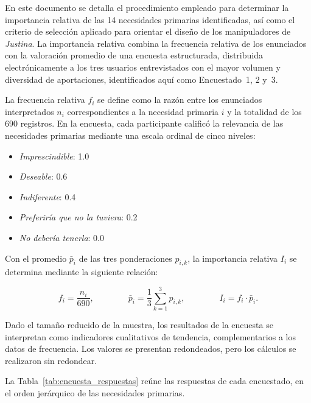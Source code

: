 \label{app:importancia_relativa}

En este documento se detalla el procedimiento empleado para determinar la importancia relativa de las 14 necesidades primarias identificadas, así como el criterio de selección aplicado para orientar el diseño de los manipuladores de \emph{Justina}. La importancia relativa combina la frecuencia relativa de los enunciados con la valoración promedio de una encuesta estructurada, distribuida electrónicamente a los tres usuarios entrevistados con el mayor volumen y diversidad de aportaciones, identificados aquí como Encuestado~1, 2 y~3.

La frecuencia relativa $f_i$ se define como la razón entre los enunciados interpretados $n_i$ correspondientes a la necesidad primaria $i$ y la totalidad de los 690 registros. En la encuesta, cada participante calificó la relevancia de las necesidades primarias mediante una escala ordinal de cinco niveles:

\begin{itemize}
    \item \textit{Imprescindible}: 1.0
    \item \textit{Deseable}: 0.6
    \item \textit{Indiferente}: 0.4
    \item \textit{Preferiría que no la tuviera}: 0.2
    \item \textit{No debería tenerla}: 0.0
\end{itemize}

Con el promedio $\bar{p}_i$ de las tres ponderaciones $p_{i,k}$, la importancia relativa $I_i$ se determina mediante la siguiente relación:

\[
f_i = \frac{n_i}{690}, \qquad \qquad
\bar{p}_i = \frac{1}{3}\sum_{k=1}^{3} p_{i,k}, \qquad \qquad
I_i = f_i \cdot \bar{p}_i .
\]

Dado el tamaño reducido de la muestra, los resultados de la encuesta se interpretan como indicadores cualitativos de tendencia, complementarios a los datos de frecuencia. Los valores se presentan redondeados, pero los cálculos se realizaron sin redondear.

La Tabla~\ref{tab:encuesta_respuestas} reúne las respuestas de cada encuestado, en el orden jerárquico de las necesidades primarias.


